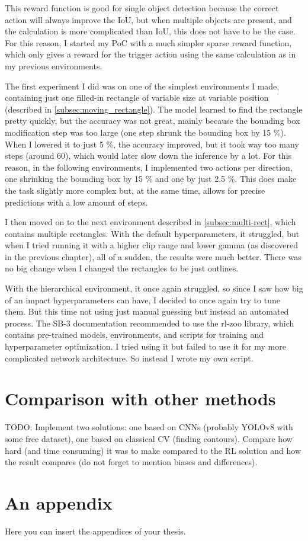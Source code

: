 \documentclass[
  digital,     %
  oneside,     %
  nosansbold,  %
  nocolorbold, %
  lof,         %
  lot,         %
]{fithesis4}
\begin{document}
This reward function is good for single object detection because the correct action will always improve the IoU, but when multiple objects are present, and the calculation is more complicated than IoU, this does not have to be the case. For this reason, I started my PoC with a much simpler sparse reward function, which only gives a reward for the trigger action using the same calculation as in my previous environments.

The first experiment I did was on one of the simplest environments I made, containing just one filled-in rectangle of variable size at variable position (described in \ref{subsec:moving_rectangle}). The model learned to find the rectangle pretty quickly, but the accuracy was not great, mainly because the bounding box modification step was too large (one step shrunk the bounding box by 15 \%). When I lowered it to just 5 \%, the accuracy improved, but it took way too many steps (around 60), which would later slow down the inference by a lot. For this reason, in the following environments, I implemented two actions per direction, one shrinking the bounding box by 15 \% and one by just 2.5 \%. This does make the task slightly more complex but, at the same time, allows for precise predictions with a low amount of steps.

I then moved on to the next environment described in \ref{subsec:multi-rect}, which contains multiple rectangles. With the default hyperparameters, it struggled, but when I tried running it with a higher clip range and lower gamma (as discovered in the previous chapter), all of a sudden, the results were much better. There was no big change when I changed the rectangles to be just outlines.

With the hierarchical environment, it once again struggled, so since I saw how big of an impact hyperparameters can have, I decided to once again try to tune them. But this time not using just manual guessing but instead an automated process. The SB-3 documentation recommended to use the rl-zoo library, which contains pre-trained models, environments, and scripts for training and hyperparameter optimization. I tried using it but failed to use it for my more complicated network architecture. So instead I wrote my own script.

\chapter{Comparison with other methods}
TODO: Implement two solutions: one based on CNNs (probably YOLOv8 with some free dataset), one based on classical CV (finding contours).
%
Compare how hard (and time consuming) it was to make compared to the RL solution and how the result compares (do not forget to mention biases and differences).


\printbibliography[heading=bibintoc] %


\appendix %
\chapter{An appendix}
Here you can insert the appendices of your thesis.
\end{document}
